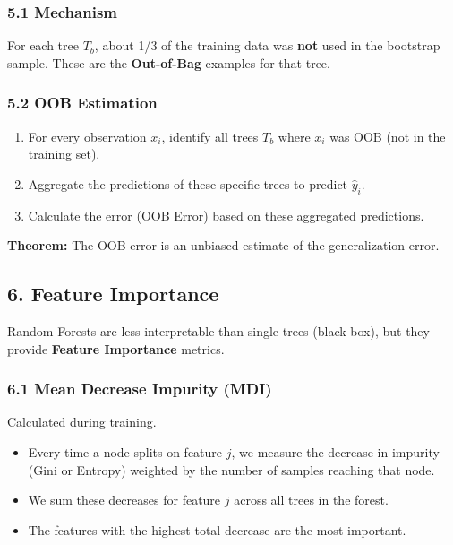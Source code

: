 \documentclass[
  italian,
  11pt,
]{article}
\begin{document}
\subsubsection{5.1 Mechanism}\label{mechanism-3}

For each tree \(T_b\), about 1/3 of the training data was \textbf{not}
used in the bootstrap sample. These are the \textbf{Out-of-Bag} examples
for that tree.

\subsubsection{5.2 OOB Estimation}\label{oob-estimation}

\begin{enumerate}
\def\labelenumi{\arabic{enumi}.}
\item
  For every observation \(x_i\), identify all trees \(T_b\) where
  \(x_i\) was OOB (not in the training set).
\item
  Aggregate the predictions of these specific trees to predict
  \(\hat{y}_i\).
\item
  Calculate the error (OOB Error) based on these aggregated predictions.
\end{enumerate}

\textbf{Theorem:} The OOB error is an unbiased estimate of the
generalization error.

\subsection{6. Feature Importance}\label{feature-importance}

Random Forests are less interpretable than single trees (black box), but
they provide \textbf{Feature Importance} metrics.

\subsubsection{6.1 Mean Decrease Impurity
(MDI)}\label{mean-decrease-impurity-mdi}

Calculated during training.

\begin{itemize}
\item
  Every time a node splits on feature \(j\), we measure the decrease in
  impurity (Gini or Entropy) weighted by the number of samples reaching
  that node.
\item
  We sum these decreases for feature \(j\) across all trees in the
  forest.
\item
  The features with the highest total decrease are the most important.
\end{itemize}
\end{document}
